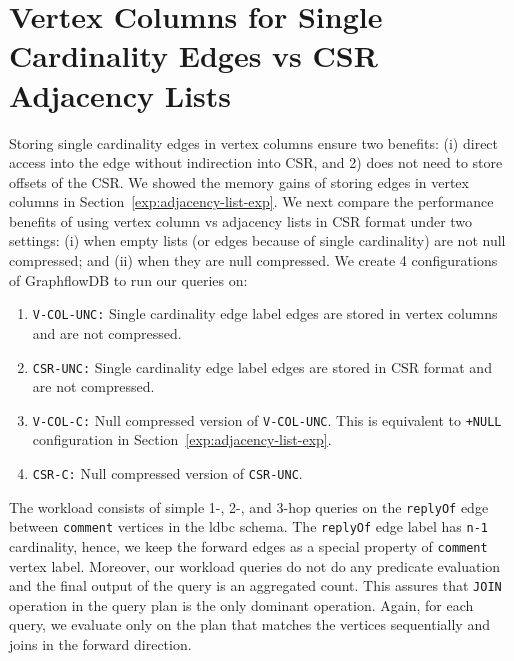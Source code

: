 \section{Vertex Columns for Single Cardinality Edges vs CSR Adjacency Lists}
\label{exp:single-cardinality}

Storing single cardinality edges in vertex columns ensure two benefits: (i) direct access into the edge without indirection into CSR, and 2) does not need to store offsets of the CSR. We showed the memory gains of storing edges in vertex columns in Section~\ref{exp:adjacency-list-exp}. We next compare the performance benefits of using vertex column vs adjacency lists in CSR format under two settings: (i) when empty lists (or edges because of single cardinality) are not null compressed; and (ii) when they are null compressed. We create 4 configurations of GraphflowDB to run our queries on:

\begin{enumerate}
	\item \texttt{V-COL-UNC:} Single cardinality edge label edges are stored in vertex columns and are not compressed. 
	\item \texttt{CSR-UNC:} Single cardinality edge label edges are stored in CSR format and are not compressed.
	\item \texttt{V-COL-C:} Null compressed version of \texttt{V-COL-UNC}. This is equivalent to \texttt{+NULL} configuration in Section~\ref{exp:adjacency-list-exp}.
	\item \texttt{CSR-C:} Null compressed version of \texttt{CSR-UNC}.
\end{enumerate}

The workload consists of simple 1-, 2-, and 3-hop queries on the \texttt{replyOf} edge between \texttt{comment} vertices in the \gls{ldbc} schema. The \texttt{replyOf} edge label has \texttt{n-1} cardinality, hence, we keep the forward edges as a special property of \texttt{comment} vertex label. Moreover, our workload queries do not do any predicate evaluation and the final output of the query is an aggregated count. This assures that \texttt{JOIN} operation in the query plan is the only dominant operation. Again, for each query, we evaluate only on the plan that matches the vertices sequentially and joins in the forward direction.

